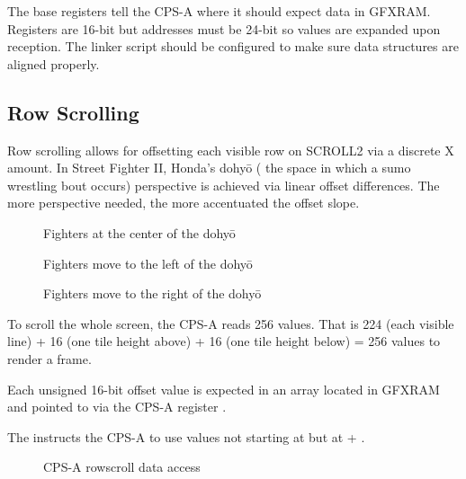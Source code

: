 The base registers tell the CPS-A where it should expect data in GFXRAM. Registers are 16-bit but addresses must be 24-bit so values are expanded  upon reception. The linker script should be configured to make sure data structures are aligned properly.

\subsection{Row Scrolling}
Row scrolling allows for offsetting each visible row on SCROLL2 via a discrete X amount. In Street Fighter II, Honda's dohyō ( the space in which a sumo wrestling bout occurs) perspective is achieved via linear offset differences. The more perspective needed, the more accentuated the offset slope. 

\begin{figure}[H]
\caption*{Fighters at the center of the dohyō}
 \end{figure}%

\begin{figure}[H]
\caption*{Fighters move to the left of the dohyō}
 \end{figure}%

\begin{figure}[H]
\caption*{Fighters move to the right of the dohyō}
 \end{figure}%

To scroll the whole screen, the CPS-A reads 256 values. That is 224 (each visible line) + 16 (one tile height above) + 16 (one tile height below) = 256 values to render a frame.

Each unsigned 16-bit offset value is expected in an array located in GFXRAM and pointed to via the CPS-A register .

The  instructs the CPS-A to use values not starting at  but at  + . 

\begin{figure}[H]
 \caption*{CPS-A rowscroll data access}%
 \end{figure}%



